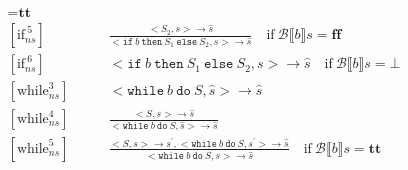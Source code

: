 \documentclass[11pt,oneside,a4paper]{article}
\begin{document}
\begin{align*}
= \textbf{tt}\\
[\text{if}_{ns}^{\:5}] \quad \quad & \frac{<S_2, s> \rightarrow \hat{s}}
{ <\texttt{if}\:b\: \texttt{then}\:  S_1 \: \texttt{else} \: S_2, s> 
\rightarrow \hat{s}} \quad \text{if} \: \mathcal{B} \llbracket b \rrbracket s
= \textbf{ff}\\
[\text{if}_{ns}^{\:6}] \quad \quad & <\texttt{if}\:b\: \texttt{then}\:  S_1 \: 
\texttt{else} \: S_2, s> \rightarrow \hat{s} \quad 
\text{if} \: \mathcal{B} \llbracket b \rrbracket s
= \bot \\
[\text{while}_{ns}^3] \quad \quad & <\texttt{while}\: b \:\texttt{do}\: S, 
\hat{s}> \rightarrow \hat{s} \\
[\text{while}_{ns}^4] \quad \quad & 
\frac{<S,s> \rightarrow \hat{s}}{<\texttt{while}\: b \:\texttt{do}\: S, 
\hat{s}> \rightarrow \hat{s}} \\
[\text{while}_{ns}^5] \quad \quad & 
\frac{<S,s> \rightarrow s^{'}, <\texttt{while}\: b \: \texttt{do} \: S, s^{'}>
\rightarrow \hat{s}}
{<\texttt{while}\: b \: \texttt{do}\: S, s> \rightarrow \hat{s}} 
\quad \text{if} \: \mathcal{B} \llbracket b \rrbracket s = \textbf{tt} \\
\end{align*}
\endgroup
\end{document}
